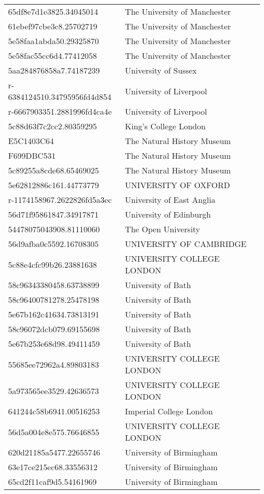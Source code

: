 \begin{tabular}{ll}
65df8e7d1e3825.34045014 & The University of Manchester \\
61ebef97cbe3c8.25702719 & The University of Manchester \\
5e58faa1abda50.29325870 & The University of Manchester \\
5e58fac55cc6d4.77412058 & The University of Manchester \\
5aa284876858a7.74187239 & University of Sussex \\
r-6384124510.34795956fd4d854 & University of Liverpool \\
r-6667903351.2881996fd4ca4e & University of Liverpool \\
5c88d63f7c2cc2.80359295 & King's College London \\
E5C1403C64 & The Natural History Museum \\
F699DBC531 & The Natural History Museum \\
5c89255a8cde68.65469025 & The Natural History Museum \\
5e62812886c161.44773779 & UNIVERSITY OF OXFORD \\
r-1174158967.2622826fd5a3ec & University of East Anglia \\
56d71f95861847.34917871 & University of Edinburgh \\
54478075043908.81110060 & The Open University \\
56d9afba0c5592.16708305 & UNIVERSITY OF CAMBRIDGE \\
5c88e4cfc99b26.23881638 & UNIVERSITY COLLEGE LONDON \\
58c96343380458.63738899 & University of Bath \\
58c96400781278.25478198 & University of Bath \\
5e67b162c41634.73813191 & University of Bath \\
58c96072dcb079.69155698 & University of Bath \\
5e67b253e68d98.49411459 & University of Bath \\
55685ee72962a4.89803183 & UNIVERSITY COLLEGE LONDON \\
5a973565ee3529.42636573 & UNIVERSITY COLLEGE LONDON \\
641244c58b6941.00516253 & Imperial College London \\
56d5a004e8e575.76646855 & UNIVERSITY COLLEGE LONDON \\
620d21185a5477.22655746 & University of Birmingham \\
63e17ce215ec68.33556312 & University of Birmingham \\
65cd2f11caf9d5.54161969 & University of Birmingham \\

\end{tabular}
